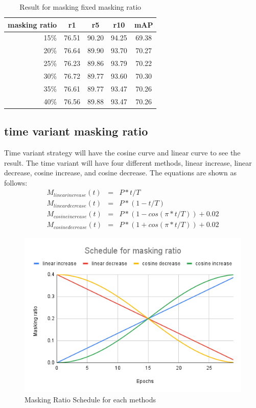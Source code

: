 \begin{table}[htbp]
\centering
  \caption{Result for masking fixed masking ratio}
  \begin{tabular}{rcccc}
    masking ratio & r1 & r5 & r10 & mAP\\ \hline
    15\% & 76.51 & 90.20 & 94.25 & 69.38 \\
    20\% & 76.64 & 89.90 & 93.70 & 70.27 \\
    25\% & 76.23 & 89.86 & 93.79 & 70.22 \\
    30\% & 76.72 & 89.77 & 93.60 & 70.30 \\
    35\% & 76.61 & 89.77 & 93.47 & 70.26 \\
    40\% & 76.56 & 89.88 & 93.47 & 70.26
  \end{tabular}
\end{table}

\subsection{time variant masking ratio}
Time variant strategy will have the cosine curve and linear curve to see the result. The time variant will have four different methods, linear increase, linear decrease, cosine increase, and cosine decrease. The equations are shown as follows:
\begin{eqnarray}
M_{linear increase}\left( t \right) &=& P*t/T \\
M_{linear decrease}\left( t \right) &=& P*\left(1-t/T\right) \\
M_{cosine increase}\left(t\right) &=& P*\left(1-cos\left(\pi*t/T\right)\right) + 0.02 \\
M_{cosine decrease}\left(t\right) &=& P*\left(1+cos\left(\pi*t/T\right)\right) + 0.02 
\end{eqnarray}

\begin{figure}[htbp]
  \includegraphics[width=\linewidth]{img/Schedule_masking_ratio.png}
  \caption{Masking Ratio Schedule for each methods}
  \label{img:masking_ratio_scheduler}
\end{figure}

